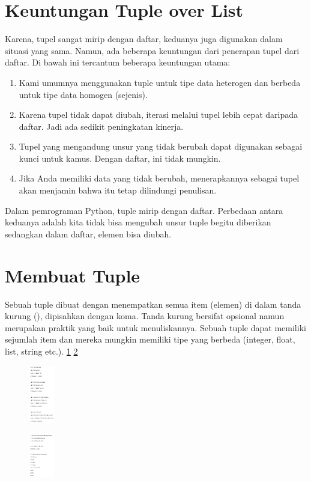\section{Keuntungan Tuple over List} 
Karena, tupel sangat mirip dengan daftar, keduanya juga digunakan dalam situasi yang sama. Namun, ada beberapa keuntungan dari penerapan tupel dari daftar. Di bawah ini tercantum beberapa keuntungan utama:
\begin{enumerate}
\item Kami umumnya menggunakan tuple untuk tipe data heterogen dan berbeda untuk tipe data homogen (sejenis). 
\item Karena tupel tidak dapat diubah, iterasi melalui tupel lebih cepat daripada daftar. Jadi ada sedikit peningkatan kinerja. 
\item Tupel yang mengandung unsur yang tidak berubah dapat digunakan sebagai kunci untuk kamus. Dengan daftar, ini tidak mungkin. 
\item Jika Anda memiliki data yang tidak berubah, menerapkannya sebagai tupel akan menjamin bahwa itu tetap dilindungi penulisan. 
\end{enumerate}
Dalam pemrograman Python, tuple mirip dengan daftar. Perbedaan antara keduanya adalah kita tidak bisa mengubah unsur tuple begitu diberikan sedangkan dalam daftar, elemen bisa diubah.
\section{Membuat Tuple}
Sebuah tuple dibuat dengan menempatkan semua item (elemen) di dalam tanda kurung (), dipisahkan dengan koma. Tanda kurung bersifat opsional namun merupakan praktik yang baik untuk menuliskannya. Sebuah tuple dapat memiliki sejumlah item dan mereka mungkin memiliki tipe yang berbeda (integer, float, list, string etc.). 
\ref{3afs1} 
\ref{3afs2} 

\begin{figure}[ht]
			\centerline{\includegraphics[width=0.1\textwidth]{figures/3afs1.JPG}}
			\caption{}
			\label{3afs1}
			\end{figure}
   
\begin{figure}[ht]
			\centerline{\includegraphics[width=0.1\textwidth]{figures/3afs2.JPG}}
			\caption{}
			\label{3afs2}
			\end{figure}
   


